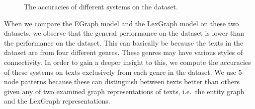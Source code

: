 \begin{figure}[!ht]
  \begin{center}
      \mydata
  \end{center}
  \caption{The accuracies of different systems on the \declercqds dataset.}
  \label{fig:declercq-ds}
\end{figure}

When we compare the EGraph model and the LexGraph model on these two datasets, we observe that the general performance on the \declercqds dataset is lower than the performance on the \pitlerds dataset. 
This can basically be because the texts in the \declercqds dataset are from four different genres. These genres may have various styles of connectivity.  
In order to gain a deeper insight to this, we compute the accuracies of these systems on texts exclusively from each genre in the \declercqds dataset. 
We use 5-node patterns because these can distinguish between texts better than others given any of two examined graph representations of texts, i.e.\ the entity graph and the LexGraph representations. 

